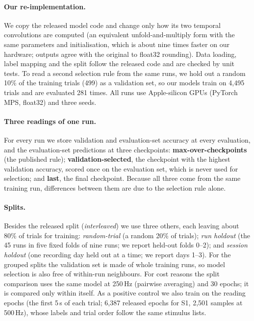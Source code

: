 \paragraph{Our re-implementation.}
We copy the released model code and change only how its two temporal convolutions are computed
(an equivalent unfold-and-multiply form with the same parameters and initialisation, which is
about nine times faster on our hardware; outputs agree with the original to float32 rounding).
Data loading, label mapping and the split follow the released code and are checked by unit tests.
To read a second selection rule from the same runs, we hold out a random 10\% of the training
trials (499) as a validation set, so our models train on 4{,}495 trials and are evaluated
281 times. All runs use Apple-silicon GPUs (PyTorch MPS, float32) and three seeds.

\paragraph{Three readings of one run.}
For every run we store validation and evaluation-set accuracy at every evaluation, and the
evaluation-set predictions at three checkpoints:
\textbf{max-over-checkpoints} (the published rule);
\textbf{validation-selected}, the checkpoint with the highest validation accuracy, scored once on
the evaluation set, which is never used for selection; and
\textbf{last}, the final checkpoint.
Because all three come from the same training run, differences between them are due to the
selection rule alone.

\paragraph{Splits.}
Besides the released split (\emph{interleaved}) we use three others, each leaving about 80\% of
trials for training:
\emph{random-trial} (a random 20\% of trials);
\emph{run holdout} (the 45 runs in five fixed folds of nine runs; we report held-out folds 0--2); and
\emph{session holdout} (one recording day held out at a time; we report days 1--3).
For the grouped splits the validation set is made of whole training runs, so model selection is also
free of within-run neighbours. For cost reasons the split comparison uses the same model at
250\,Hz (pairwise averaging) and 30 epochs; it is compared only within itself. As a positive control
we also train on the reading epochs (the first 5\,s of each trial; 6{,}387 released epochs for S1,
2{,}501 samples at 500\,Hz), whose labels and trial order follow the same stimulus lists.

